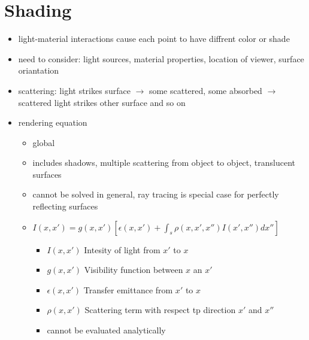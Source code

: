 \documentclass[11pt,a4paper]{article}
\begin{document}
\section{Shading}
\begin{itemize}
	\item light-material interactions cause each point to have diffrent color or shade
	\item need to consider: light sources, material properties, location of viewer, surface oriantation
	\item scattering: light strikes surface $\rightarrow$ some scattered, some absorbed $\rightarrow$  scattered light strikes other surface and so on
	\item rendering equation
	\begin{itemize} 
		\item global
		\item includes shadows, multiple scattering from object to object, translucent surfaces
		\item cannot be solved in general, ray tracing is special case for perfectly reflecting surfaces
		\item $I(x,x')=g(x,x')[ \epsilon (x,x')+ \int_s \rho (x,x',x'')I(x',x'')dx'']$
		\begin{itemize}
			\item $I(x,x')$ Intesity of light from $x'$ to $x$
			\item $g(x,x')$ Visibility function between $x$ an $x'$
			\item $\epsilon(x,x')$ Transfer emittance from $x'$ to $x$
			\item $\rho(x,x')$ Scattering term with respect tp direction $x'$ and $x''$
			\item cannot be evaluated analytically
		\end{itemize}
	

\end{itemize}
\end{itemize}
\end{document}
